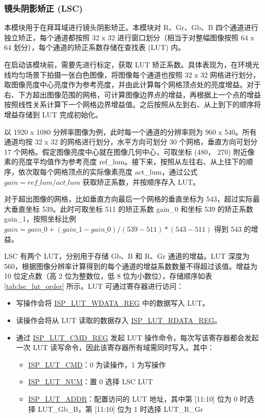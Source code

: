 \documentclass[main\_\_CN.tex]{subfiles}
\begin{document}
\subsubsection{镜头阴影矫正 (LSC)}
\label{sec:isp_lsc}
本模块用于在拜耳域进行镜头阴影矫正。本模块对 R、Gr、Gb、B 四个通道进行独立矫正，每个通道都按照 32 x 32 进行窗口划分（相当于对整幅图像按照 64 x 64 划分），每个通道的矫正系数存储在查找表 (LUT) 内。

在启动该模块前，需要先进行标定，获取 LUT 矫正系数。具体表现为，在环境光线均匀场景下拍摄一张白色图像，将图像每个通道也按照 32 x 32 网格进行划分，取图像亮度中心亮度作为参考亮度，并由此计算每个网格顶点处的亮度增益。对于右、下方超出图像范围的网格，可计算图像边界点的增益，再根据上一个点的增益按照线性关系计算下一个网格边界增益值。之后按照从左到右、从上到下的顺序将增益存储到 LUT 完成初始化。

以 1920 x 1080 分辨率图像为例，此时每一个通道的分辨率则为 960 x 540。所有通道均按 32 x 32 的网格进行划分，水平方向可划分 30 个网格，垂直方向可划分 17 个网格。假定图像亮度中心就在图像几何中心，可取坐标 (480， 270) 附近像素的亮度平均值作为参考亮度 ref\_lum。接下来，按照从左往右、从上往下的顺序，依次取每个网格顶点的实际像素亮度 act\_lum，通过公式 $gain = ref\_lum / act\_lum$ 获取矫正系数，并按顺序存入 LUT。

对于超出图像的网格，比如垂直方向最后一个网格的垂直坐标为 543，超过实际最大垂直坐标 539。此时可取坐标 511 的矫正系数 gain\_0 和坐标 539 的矫正系数 gain\_1，按照坐标比例 $gain = gain\_0 + (gain\_1 - gain\_0) / (539 - 511) * (543 - 511)$ 得到 543 的增益。

LSC 有两个 LUT，分别用于存储 Gb、B 和 R、Gr 通道的增益。LUT 深度为 560，根据图像分辨率计算得到的每个通道的增益系数数量不得超过该值。增益为 10 位定点数（高 2 位为整数位，低 8 位为小数位），存储顺序如表 \ref{tab:lsc_lut_order} 所示。LUT 可通过寄存器进行访问：
\begin{itemize}
    \item 写操作会将 \hyperref[regdesc:ISPLUTWDATAREG]{ISP\_LUT\_WDATA\_REG} 中的数据写入 LUT。
    \item 读操作会将从 LUT 读取的数据存入 \hyperref[regdesc:ISPLUTRDATAREG]{ISP\_LUT\_RDATA\_REG}。
    \item 通过 \hyperref[regdesc:ISPLUTCMDREG]{ISP\_LUT\_CMD\_REG} 发起 LUT 操作命令，每次写该寄存器都会发起一次 LUT 读写命令，因此该寄存器所有域需同时写入。其中：\\
    \begin{itemize}
        \item \hyperref[fielddesc:ISPLUTCMD]{ISP\_LUT\_CMD}：0 为读操作，1 为写操作
        \item \hyperref[fielddesc:ISPLUTNUM]{ISP\_LUT\_NUM}：置 0 选择 LSC LUT
        \item \hyperref[fielddesc:ISPLUTADDR]{ISP\_LUT\_ADDR}：配置访问的 LUT 地址，其中第 [11:10] 位为 0 时选择 LUT\_Gb\_B，第 [11:10] 位为 1 时选择 LUT\_R\_Gr
    \end{itemize}
\end{itemize}
\end{document}
